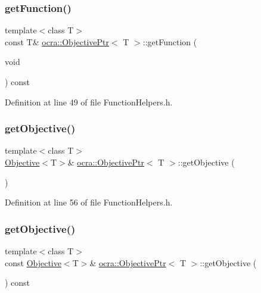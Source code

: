 \subsubsection{\texorpdfstring{get\+Function()}{getFunction()}\hspace{0.1cm}{\footnotesize\ttfamily [2/2]}}
{\footnotesize\ttfamily template$<$class T$>$ \\
const T\& \hyperlink{classocra_1_1ObjectivePtr}{ocra\+::\+Objective\+Ptr}$<$ T $>$\+::get\+Function (\begin{DoxyParamCaption}\item[{void}]{ }\end{DoxyParamCaption}) const\hspace{0.3cm}{\ttfamily [inline]}}



Definition at line 49 of file Function\+Helpers.\+h.

\hypertarget{classocra_1_1ObjectivePtr_a0069561ac9c93a92ff2e7156267550ce}{}\label{classocra_1_1ObjectivePtr_a0069561ac9c93a92ff2e7156267550ce} 
\subsubsection{\texorpdfstring{get\+Objective()}{getObjective()}\hspace{0.1cm}{\footnotesize\ttfamily [1/2]}}
{\footnotesize\ttfamily template$<$class T$>$ \\
\hyperlink{classocra_1_1Objective}{Objective}$<$T$>$\& \hyperlink{classocra_1_1ObjectivePtr}{ocra\+::\+Objective\+Ptr}$<$ T $>$\+::get\+Objective (\begin{DoxyParamCaption}{ }\end{DoxyParamCaption})\hspace{0.3cm}{\ttfamily [inline]}}



Definition at line 56 of file Function\+Helpers.\+h.

\hypertarget{classocra_1_1ObjectivePtr_a6873607fc915a103ca5e6c3a7bc54764}{}\label{classocra_1_1ObjectivePtr_a6873607fc915a103ca5e6c3a7bc54764} 
\subsubsection{\texorpdfstring{get\+Objective()}{getObjective()}\hspace{0.1cm}{\footnotesize\ttfamily [2/2]}}
{\footnotesize\ttfamily template$<$class T$>$ \\
const \hyperlink{classocra_1_1Objective}{Objective}$<$T$>$\& \hyperlink{classocra_1_1ObjectivePtr}{ocra\+::\+Objective\+Ptr}$<$ T $>$\+::get\+Objective (\begin{DoxyParamCaption}{ }\end{DoxyParamCaption}) const\hspace{0.3cm}{\ttfamily [inline]}}



